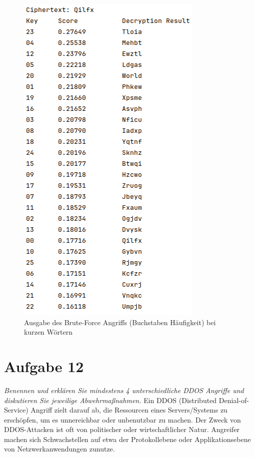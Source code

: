 \documentclass{article}
\begin{document}
    \begin{figure}[h!]
        \includegraphics[scale=0.5]{text_results/console_out3.png}
        \caption{Ausgabe des Brute-Force Angriffs (Buchstaben Häufigkeit) bei kurzen Wörtern}
        \label{fig:buchstaben_bad}
    \end{figure}
    \section{Aufgabe 12}
    \textit{Benennen und erklären Sie mindestens 4 unterschiedliche DDOS Angriffe und diskutieren Sie jeweilige Abwehrmaßnahmen.}
    \vspace*{1em}\newline
    Ein DDOS (Distributed Denial-of-Service) Angriff zielt darauf ab, die Ressourcen eines Servers/Systems zu erschöpfen,
    um es unnereichbar oder unbenutzbar zu machen. Der Zweck von DDOS-Attacken ist oft von politischer oder wirtschaftlicher Natur.
    Angreifer machen sich Schwachstellen auf etwa der Protokollebene oder Applikationsebene von Netzwerkanwendungen zunutze.
\end{document}
